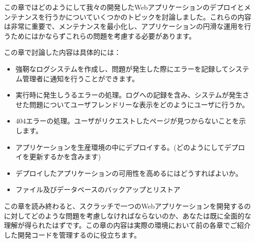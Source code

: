 この章ではどのようにして我々の開発したWebアプリケーションのデプロイとメンテナンスを行うかについていくつかのトピックを討論しました。これらの内容は非常に重要で、メンテナンスを最小化し、アプリケーションの円滑な運用を行うためにはかならずこれらの問題を考慮する必要があります。

この章で討論した内容は具体的には：

\begin{itemize}
  \item 強靭なログシステムを作成し、問題が発生した際にエラーを記録してシステム管理者に通知を行うことができます。
  \item 実行時に発生しうるエラーの処理。ログへの記録を含み、システムが発生させた問題についてユーザフレンドリーな表示をどのようにユーザに行うか。
  \item 404エラーの処理。ユーザがリクエストしたページが見つからないことを示します。
  \item アプリケーションを生産環境の中にデプロイする。(どのようにしてデプロイを更新するかを含みます)
  \item デプロイしたアプリケーションの可用性を高めるにはどうすればよいか。
  \item ファイル及びデータベースのバックアップとリストア
\end{itemize}

この章を読み終わると、スクラッチで一つのWebアプリケーションを開発するのに対してどのような問題を考慮しなければならないのか、あなたは既に全面的な理解が得られたはずです。この章の内容は実際の環境において前の各章でご紹介した開発コードを管理するのに役立ちます。
